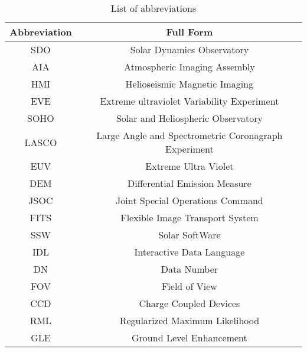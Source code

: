 \thispagestyle{empty}


\begin{table*}[h!]
    \centering
    \setlength{\tabcolsep}{10pt}
    \renewcommand{\arraystretch}{1.5}
    \begin{tabular}{ | c | c | }
      \hline
      \textbf{Abbreviation} & \textbf{Full Form} \\
      \hline
      SDO & Solar Dynamics Observatory \\
      AIA & Atmospheric Imaging Assembly \\
      HMI & Helioseismic Magnetic Imaging \\
      EVE & Extreme ultraviolet Variability Experiment \\
      SOHO & Solar and Heliospheric Observatory \\
      LASCO & Large Angle and Spectrometric Coronagraph Experiment \\
      EUV & Extreme Ultra Violet \\
      DEM & Differential Emission Measure \\
      JSOC & Joint Special Operations Command \\
      FITS & Flexible Image Transport System \\
      SSW & Solar SoftWare \\
      IDL & Interactive Data Language \\
      DN & Data Number \\
      FOV & Field of View \\
      CCD & Charge Coupled Devices \\
      RML & Regularized Maximum Likelihood \\
      GLE & Ground Level Enhancement \\
      \hline
    \end{tabular}
    \caption{List of abbreviations}
    \label{table:abbr}
\end{table*}

